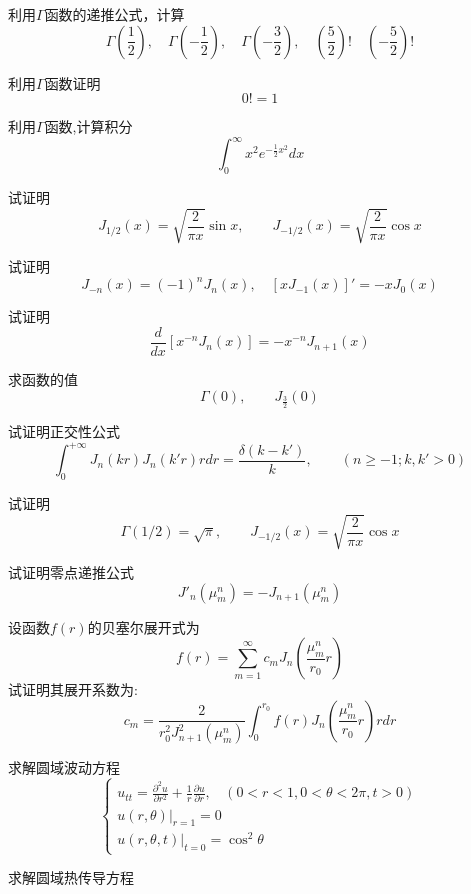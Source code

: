 \begin{Exercises}
	\item 利用$\Gamma$函数的递推公式，计算 
		$$\Gamma(\frac{1}{2}), \quad  \Gamma(-\frac{1}{2}), \quad \Gamma(-\frac{3}{2}), \quad (\frac{5}{2})!  \quad (-\frac{5}{2})! $$ 
	\item 利用$\Gamma$函数证明
		\[0! =1 \] 
	\item 利用$\Gamma$函数,计算积分
		\[\int_{0}^{\infty} x^2 e^{-\frac{1}{2}x^2} dx \]
	\item 试证明
	\begin{equation*}
		J_{1/2} (x) =\sqrt{\frac{2}{\pi x}} \sin x,  \qquad  J_{-1/2} (x) =\sqrt{\frac{2}{\pi x}} \cos x
	\end{equation*} 
		\item 试证明
		\[ J_{-n}(x) = (-1)^n J_{n}(x), \quad [x J_{-1}(x)]' = -x  J_{0}(x) \]
		\item 试证明
		\[\frac{d}{d x}\left[x^{-n} J_{n}(x)\right] = -x^{-n} J_{n+1}(x)\] 
		\item 求函数的值
		\[ \Gamma(0),\qquad  J_{\frac{3}{2}}(0)\]
		\item 试证明正交性公式
	    \[\int_{0}^{+\infty} J_n(kr)J_n(k'r) r dr = \frac{\delta(k-k')}{k}, \qquad (n\geq-1; k, k'>0)\]
		\item 试证明
		\begin{equation*}
			\Gamma(1/2)=\sqrt{\pi}, \qquad J_{-1/2}(x) = \sqrt{\frac{2}{\pi x}} \cos x  
		\end{equation*}
		\item 试证明零点递推公式  \[ J'_n(\mu_m ^n)= - J_{n+1}(\mu_m ^n)\]
		\item 设函数$f(r)$的贝塞尔展开式为
		\begin{equation*}
			f(r)=\sum_{m=1}^\infty c_m J_n(\frac{\mu_m ^n}{r_0} r)
		\end{equation*}	
		试证明其展开系数为: 
		\begin{equation*}
			c_m=\frac{2} {r^2_0 J_{n+1} ^2 (\mu_m ^n)} \int_0 ^{r_0} f(r) J_n(\frac{\mu_m ^n}{r_0} r) r dr 
		\end{equation*}	
		\item 求解圆域波动方程
		$$\begin{cases}
			\displaystyle u_{tt} = \frac{\partial^2 u }{\partial r^2 } +\frac{1}{r } \frac{\partial u }{\partial r }, ~~~~ (0<r<1, 0<\theta<2\pi, t>0) \\
			u(r,\theta)|_{r=1}=0 	\\
			u(r,\theta,t)|_{t=0} =\cos^2\theta
		\end{cases} $$
		\item 求解圆域热传导方程

\end{Exercises}
